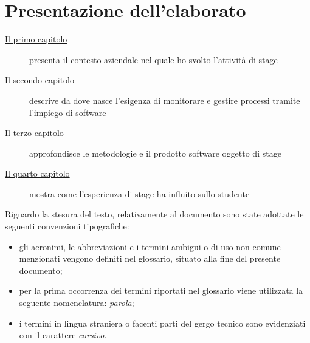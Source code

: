 
\cleardoublepage
{}
{}
\begingroup
\let\clearpage\relax
\let\cleardoublepage\relax
\let\cleardoublepage\relax

\chapter*{Presentazione dell'elaborato}
\begin{description}
    \item[{\hyperref[cap:introduzione]{Il primo capitolo}}] presenta il contesto aziendale nel quale ho svolto l'attività di stage
    \item[{\hyperref[cap:process-mining]{Il secondo capitolo}}] descrive da dove nasce l'esigenza di monitorare e gestire processi tramite l'impiego di software
    
    \item[{\hyperref[cap:modalita-svolgimento]{Il terzo capitolo}}] approfondisce le metodologie e il prodotto software oggetto di stage
    
    \item[{\hyperref[cap:performance-stage]{Il quarto capitolo}}] mostra come l'esperienza di stage ha influito sullo studente
    
\end{description}

Riguardo la stesura del testo, relativamente al documento sono state adottate le seguenti convenzioni tipografiche:
\begin{itemize}
	\item gli acronimi, le abbreviazioni e i termini ambigui o di uso non comune menzionati vengono definiti nel glossario, situato alla fine del presente documento;
	\item per la prima occorrenza dei termini riportati nel glossario viene utilizzata la seguente nomenclatura: \emph{parola}\glsfirstoccur;
	\item i termini in lingua straniera o facenti parti del gergo tecnico sono evidenziati con il carattere \emph{corsivo}.
\end{itemize}


%
%

\endgroup			

\vfill

